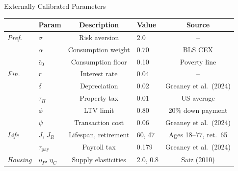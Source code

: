 \documentclass[11pt,aspectratio=169]{beamer}
\begin{document}
\begin{frame}{Externally Calibrated Parameters}
\small
\renewcommand{\arraystretch}{0.95}
\centering
\begin{tabular}{llclc}
\toprule
& \textbf{Param} & \textbf{Description} & \textbf{Value} & \textbf{Source} \\
\midrule
\textit{Pref.} & $\sigma$ & Risk aversion & 2.0 & -- \\
& $\alpha$ & Consumption weight & 0.70 & BLS CEX \\
& $\bar c_0$ & Consumption floor & 0.10 & Poverty line \\
\midrule
\textit{Fin.} & $r$ & Interest rate & 0.04 & -- \\
& $\delta$ & Depreciation & 0.02 & Greaney et al.\ (2024) \\
& $\tau_H$ & Property tax & 0.01 & US average \\
& $\phi$ & LTV limit & 0.80 & 20\% down payment \\
& $\psi$ & Transaction cost & 0.06 & Greaney et al.\ (2024) \\
\midrule
\textit{Life} & $J$, $J_R$ & Lifespan, retirement & 60, 47 & Ages 18--77, ret.\ 65 \\
& $\tau_{\text{pay}}$ & Payroll tax & 0.179 & Greaney et al.\ (2024) \\
\midrule
\textit{Housing} & $\eta_P$, $\eta_C$ & Supply elasticities & 2.0, 0.8 & Saiz (2010) \\
\bottomrule
\end{tabular}
\end{frame}
\end{document}
